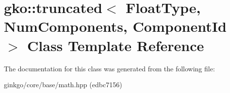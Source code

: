 \hypertarget{classgko_1_1truncated}{}\section{gko\+:\+:truncated$<$ Float\+Type, Num\+Components, Component\+Id $>$ Class Template Reference}
\label{classgko_1_1truncated}


The documentation for this class was generated from the following file\+:\begin{DoxyCompactItemize}
\item 
ginkgo/core/base/math.\+hpp (edbc7156)\end{DoxyCompactItemize}
